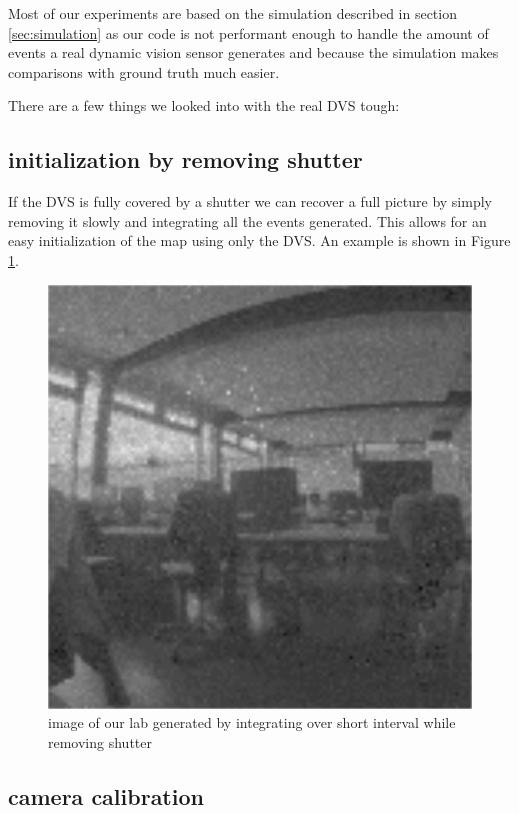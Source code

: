 Most of our experiments are based on the simulation described in section
\ref{sec:simulation} as our code is not performant enough to handle the amount
of events a real dynamic vision sensor generates and because the simulation
makes comparisons with ground truth much easier.

There are a few things we looked into with the real DVS tough:

\subsection{initialization by removing shutter}
\label{sec:shutter_removal}

If the DVS is fully covered by a shutter we can recover a full picture by
simply removing it slowly and integrating all the events generated. This allows
for an easy initialization of the map using only the DVS. An example is shown in Figure \ref{fig:shutter_integration}.

\begin{figure}
\includegraphics[width=\linewidth]{images/PCLab_integrated.png}
\caption{image of our lab generated by integrating over short interval while removing shutter}
\label{fig:shutter_integration}
\end{figure}


\subsection{camera calibration}
\label{sec:calibration}

